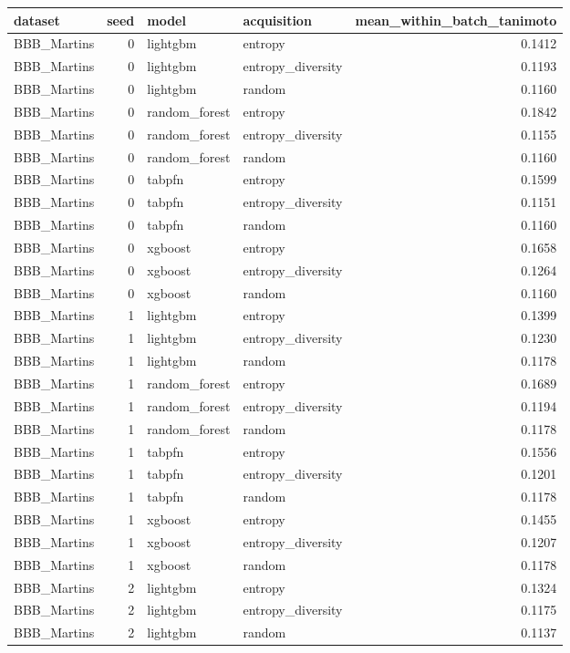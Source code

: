 \begin{tabular}{lrllr}
\toprule
dataset & seed & model & acquisition & mean_within_batch_tanimoto \\
\midrule
BBB_Martins & 0 & lightgbm & entropy & 0.1412 \\
BBB_Martins & 0 & lightgbm & entropy_diversity & 0.1193 \\
BBB_Martins & 0 & lightgbm & random & 0.1160 \\
BBB_Martins & 0 & random_forest & entropy & 0.1842 \\
BBB_Martins & 0 & random_forest & entropy_diversity & 0.1155 \\
BBB_Martins & 0 & random_forest & random & 0.1160 \\
BBB_Martins & 0 & tabpfn & entropy & 0.1599 \\
BBB_Martins & 0 & tabpfn & entropy_diversity & 0.1151 \\
BBB_Martins & 0 & tabpfn & random & 0.1160 \\
BBB_Martins & 0 & xgboost & entropy & 0.1658 \\
BBB_Martins & 0 & xgboost & entropy_diversity & 0.1264 \\
BBB_Martins & 0 & xgboost & random & 0.1160 \\
BBB_Martins & 1 & lightgbm & entropy & 0.1399 \\
BBB_Martins & 1 & lightgbm & entropy_diversity & 0.1230 \\
BBB_Martins & 1 & lightgbm & random & 0.1178 \\
BBB_Martins & 1 & random_forest & entropy & 0.1689 \\
BBB_Martins & 1 & random_forest & entropy_diversity & 0.1194 \\
BBB_Martins & 1 & random_forest & random & 0.1178 \\
BBB_Martins & 1 & tabpfn & entropy & 0.1556 \\
BBB_Martins & 1 & tabpfn & entropy_diversity & 0.1201 \\
BBB_Martins & 1 & tabpfn & random & 0.1178 \\
BBB_Martins & 1 & xgboost & entropy & 0.1455 \\
BBB_Martins & 1 & xgboost & entropy_diversity & 0.1207 \\
BBB_Martins & 1 & xgboost & random & 0.1178 \\
BBB_Martins & 2 & lightgbm & entropy & 0.1324 \\
BBB_Martins & 2 & lightgbm & entropy_diversity & 0.1175 \\
BBB_Martins & 2 & lightgbm & random & 0.1137 \\

\end{tabular}
